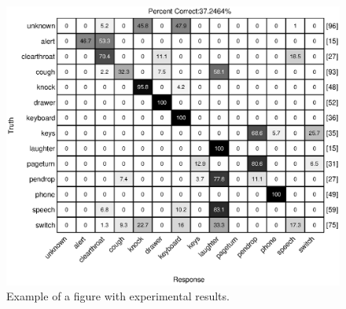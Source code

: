 \begin{figure}[h]
  \centering
  \centerline{\includegraphics[width=\columnwidth]{confmatrix2}}
  \caption{Example of a figure with experimental results.}
  \label{fig:confmat_seg}
\end{figure}
